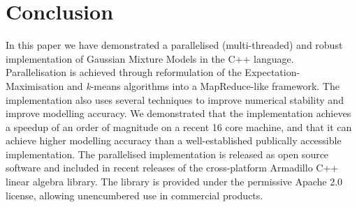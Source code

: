 \section{Conclusion}


In this paper we have demonstrated a parallelised (multi-threaded) and robust implementation
of Gaussian Mixture Models in the C++ language.
Parallelisation is achieved through reformulation of the Expectation-Maximisation and {\it k}-means algorithms into a MapReduce-like framework.
The implementation also uses several techniques to improve numerical stability and improve modelling accuracy.
We demonstrated that the implementation achieves a speedup of an order of magnitude on a recent 16 core machine,
and that it can achieve higher modelling accuracy than a well-established publically accessible implementation.
The parallelised implementation is released as open source software
and included in recent releases of the cross-platform Armadillo C++ linear algebra library.
The library is provided under the permissive Apache 2.0 license, allowing unencumbered use in commercial products.
  
